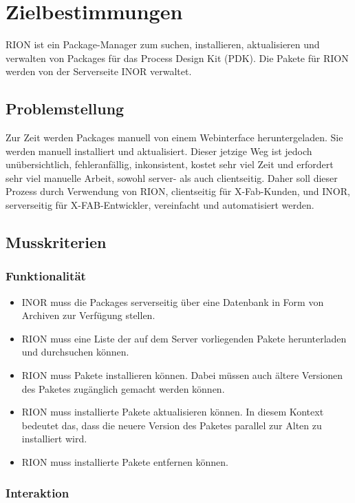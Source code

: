 \chapter{Zielbestimmungen}

RION ist ein Package-Manager zum suchen, installieren, aktualisieren und verwalten von Packages für das Process Design Kit (PDK). Die Pakete für RION werden von der Serverseite INOR verwaltet.

\section{Problemstellung}
Zur Zeit werden Packages manuell von einem Webinterface heruntergeladen. Sie werden manuell installiert und aktualisiert. Dieser jetzige Weg ist jedoch unübersichtlich, fehleranfällig, inkonsistent, kostet sehr viel Zeit und erfordert sehr viel manuelle Arbeit, sowohl server- als auch clientseitig. Daher soll dieser Prozess durch Verwendung von RION, clientseitig für X-Fab-Kunden, und INOR, serverseitig für X-FAB-Entwickler, vereinfacht und automatisiert werden.

\section{Musskriterien}
\subsection{Funktionalität}
\begin{itemize}
		\item INOR muss die Packages serverseitig über eine Datenbank in Form von Archiven zur Verfügung stellen.
		\item RION muss eine Liste der auf dem Server vorliegenden Pakete herunterladen und durchsuchen können.
		\item RION muss Pakete installieren können. Dabei müssen auch ältere Versionen des Paketes zugänglich gemacht werden können.
		\item RION muss installierte Pakete aktualisieren können. In diesem Kontext bedeutet das, dass die neuere Version des Paketes parallel zur Alten zu installiert wird.
		\item RION muss installierte Pakete entfernen können.
\end{itemize}

\subsection{Interaktion}


